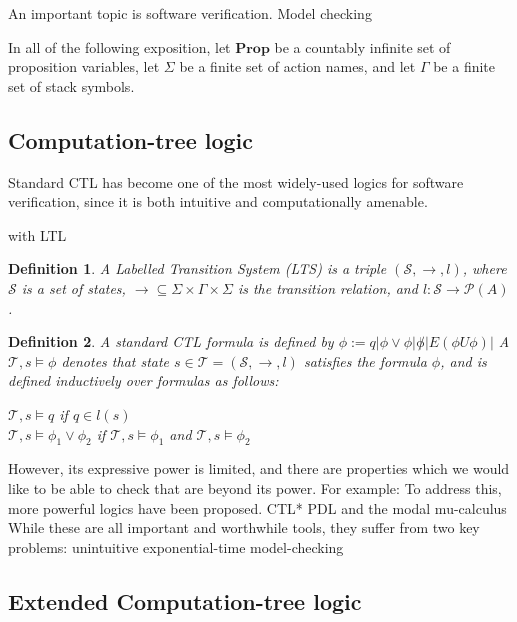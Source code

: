 \documentclass[11pt]{article}
\newtheorem{mydef}{Definition}
\begin{document}
An important topic 
is software verification.
Model checking




In all of the following exposition, let $\textbf{Prop}$ be a countably infinite
set of proposition variables, let $\Sigma$ be a finite set of action names, and
let $\Gamma$ be a finite set of stack symbols.

\subsection{Computation-tree logic}

Standard CTL has become %
one of the most widely-used logics for software verification, since it is both intuitive and computationally amenable.

with LTL

\begin{mydef}
A Labelled Transition System (LTS) is a triple $(\mathcal{S}, \rightarrow, l)$,
where $\mathcal{S}$ is a set of states, $\rightarrow \subseteq \Sigma \times
\Gamma \times \Sigma$ is the transition relation, and $l:\mathcal{S}
\rightarrow \mathcal{P}(A)$.
\end{mydef}

\begin{mydef}
A standard CTL formula is defined by
$\phi := q | \phi \vee \phi | \not \phi | E(\phi U \phi) | $%
A $\mathcal{T}, s \models \phi$ denotes that state $s \in \mathcal{T} = (\mathcal{S}, \rightarrow, l)$ satisfies the formula $\phi$, and is defined inductively over formulas as follows:

$\mathcal{T}, s \models q$ if $q \in l(s)$ \\
$\mathcal{T}, s \models \phi_1 \vee \phi_2$ if $\mathcal{T}, s \models \phi_1$ and $\mathcal{T}, s \models \phi_2$ \\
\end{mydef}

However, its expressive power is limited, and there are properties which we would like to be able to check that are beyond its power.
For example: 
To address this, more powerful logics have been proposed. CTL* %
 PDL %
and the modal mu-calculus
While these are all important and worthwhile tools, they suffer from two key problems: 
unintuitive
exponential-time model-checking


\subsection{Extended Computation-tree logic}
\end{document}
